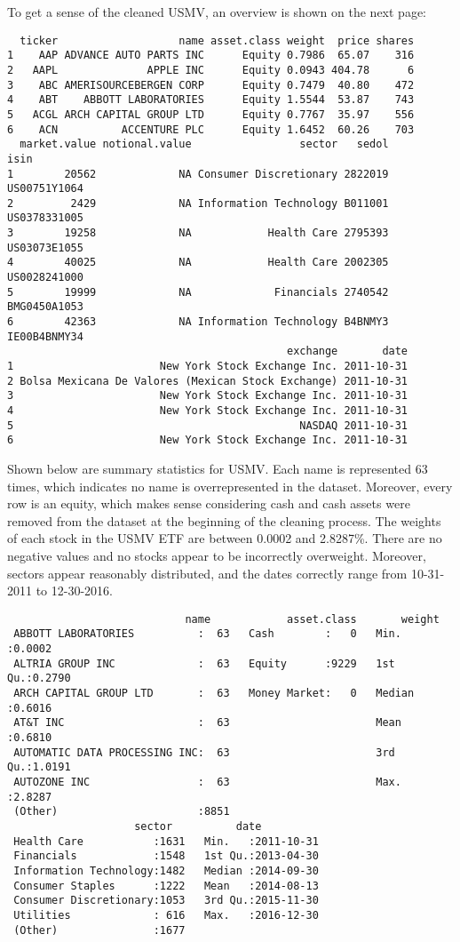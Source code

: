 \documentclass[12pt,twoside]{reedthesis}
\theoremstyle{definition}
\theoremstyle{definition}
\theoremstyle{definition}
\theoremstyle{remark}
\begin{document}
To get a sense of the cleaned USMV, an overview is shown on the next
page:
\begin{verbatim}
  ticker                   name asset.class weight  price shares
1    AAP ADVANCE AUTO PARTS INC      Equity 0.7986  65.07    316
2   AAPL              APPLE INC      Equity 0.0943 404.78      6
3    ABC AMERISOURCEBERGEN CORP      Equity 0.7479  40.80    472
4    ABT    ABBOTT LABORATORIES      Equity 1.5544  53.87    743
5   ACGL ARCH CAPITAL GROUP LTD      Equity 0.7767  35.97    556
6    ACN          ACCENTURE PLC      Equity 1.6452  60.26    703
  market.value notional.value                 sector   sedol         isin
1        20562             NA Consumer Discretionary 2822019 US00751Y1064
2         2429             NA Information Technology B011001 US0378331005
3        19258             NA            Health Care 2795393 US03073E1055
4        40025             NA            Health Care 2002305 US0028241000
5        19999             NA             Financials 2740542 BMG0450A1053
6        42363             NA Information Technology B4BNMY3 IE00B4BNMY34
                                            exchange       date
1                       New York Stock Exchange Inc. 2011-10-31
2 Bolsa Mexicana De Valores (Mexican Stock Exchange) 2011-10-31
3                       New York Stock Exchange Inc. 2011-10-31
4                       New York Stock Exchange Inc. 2011-10-31
5                                             NASDAQ 2011-10-31
6                       New York Stock Exchange Inc. 2011-10-31
\end{verbatim}
Shown below are summary statistics for USMV. Each name is represented 63
times, which indicates no name is overrepresented in the dataset.
Moreover, every row is an equity, which makes sense considering cash and
cash assets were removed from the dataset at the beginning of the
cleaning process. The weights of each stock in the USMV ETF are between
0.0002 and 2.8287\%. There are no negative values and no stocks appear
to be incorrectly overweight. Moreover, sectors appear reasonably
distributed, and the dates correctly range from 10-31-2011 to
12-30-2016.
\begin{verbatim}
                            name            asset.class       weight      
 ABBOTT LABORATORIES          :  63   Cash        :   0   Min.   :0.0002  
 ALTRIA GROUP INC             :  63   Equity      :9229   1st Qu.:0.2790  
 ARCH CAPITAL GROUP LTD       :  63   Money Market:   0   Median :0.6016  
 AT&T INC                     :  63                       Mean   :0.6810  
 AUTOMATIC DATA PROCESSING INC:  63                       3rd Qu.:1.0191  
 AUTOZONE INC                 :  63                       Max.   :2.8287  
 (Other)                      :8851                                       
                    sector          date           
 Health Care           :1631   Min.   :2011-10-31  
 Financials            :1548   1st Qu.:2013-04-30  
 Information Technology:1482   Median :2014-09-30  
 Consumer Staples      :1222   Mean   :2014-08-13  
 Consumer Discretionary:1053   3rd Qu.:2015-11-30  
 Utilities             : 616   Max.   :2016-12-30  
 (Other)               :1677                       
\end{verbatim}
\end{document}
